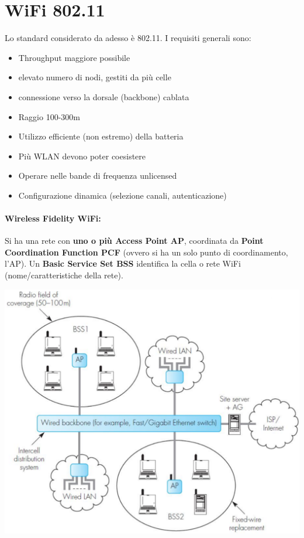
\section{WiFi 802.11}
Lo standard considerato da adesso è 802.11. I requisiti generali sono: 
\begin{itemize}
	\item Throughput maggiore possibile
	\item elevato numero di nodi, gestiti da più celle
	\item connessione verso la dorsale (backbone) cablata
	\item Raggio 100-300m
	\item Utilizzo efficiente (non estremo) della batteria
	\item Più WLAN devono poter coesistere
	\item Operare nelle bande di frequenza unlicensed
	\item Configurazione dinamica (selezione canali, autenticazione)
\end{itemize}

\paragraph{Wireless Fidelity WiFi:} Si ha una rete con \textbf{uno o più Access Point AP}, coordinata da \textbf{Point Coordination Function PCF} (ovvero si ha un solo punto di coordinamento, l'AP). Un \textbf{Basic Service Set BSS} identifica la cella o rete WiFi (nome/caratteristiche della rete).
\begin{center}
	\includegraphics[width=0.7\linewidth]{img/wlan/wifistruct1}
\end{center}

